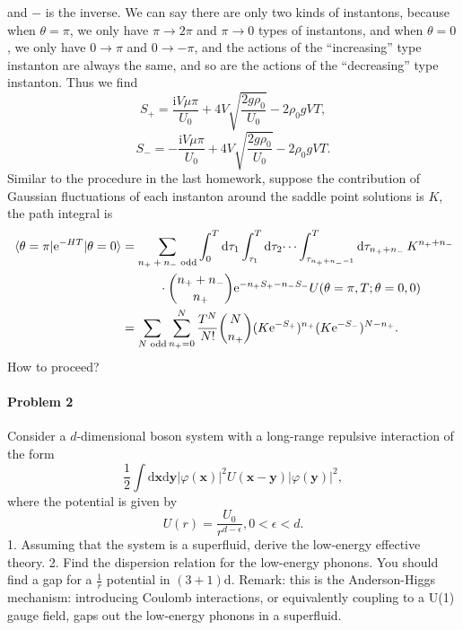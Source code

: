 \documentclass[hyperref, a4paper]{article}
\newcommand*{\ii}{\mathrm{i}}
\newcommand*{\ee}{\mathrm{e}}
\begin{document}
\begin{itemize}
and $-$ is the inverse.
We can say there are only two kinds of instantons,
because when $\theta = \pi$,
we only have $\pi \to 2\pi$ and $\pi \to 0$ types of instantons,
and when $\theta = 0$,
we only have $0 \to \pi$ and $0 \to - \pi$,
and the actions of the ``increasing'' type instanton are always the same,
and so are the actions of the ``decreasing'' type instanton.
Thus we find 
\begin{equation}
    S_+ = \frac{\ii V \mu \pi}{U_0} + 4 V \sqrt{\frac{2 g \rho_0}{U_0}} - 2 \rho_0 g V T,
\end{equation}
\begin{equation}
    S_- = - \frac{\ii V \mu \pi}{U_0} + 4 V \sqrt{\frac{2 g \rho_0}{U_0}} - 2 \rho_0 g V T.
\end{equation}
Similar to the procedure in the last homework,
suppose the contribution of Gaussian fluctuations of each instanton around the saddle point solutions is $K$,
the path integral is 
\begin{equation}
    \begin{aligned}
        \mel{\theta = \pi}{\ee^{- H T}}{\theta = 0} &= \sum_{\text{$n_+ + n_-$ odd}}
        \int_0^{T} \dd{\tau_1} \int_{\tau_1}^{T} \dd{\tau_2} \dots \int_{\tau_{n_+ + n_- - 1}}^T 
        \dd{\tau_{n_+ + n_-}} K^{n_+ + n_-}  \\
        &\quad \quad \quad \cdot \binom{n_+ + n_-}{n_+} \ee^{- n_+ S_+ - n_- S_-} U(\theta = \pi, T; \theta = 0, 0) \\
        &= \sum_{\text{$N$ odd}} \sum_{n_+ = 0}^N \frac{T^N}{N!} 
        \binom{N}{n_+} (K \ee^{- S_+})^{n_+} (K \ee^{- S_-})^{N - n_+}.
    \end{aligned}
\end{equation}
How to proceed?

\end{itemize}

\paragraph{Problem 2} Consider a $d$-dimensional boson system with a long-range repulsive interaction of the form
$$
\frac{1}{2} \int \mathrm{d} \mathbf{x} \mathrm{d} \mathbf{y}|\varphi(\mathbf{x})|^2 U(\mathbf{x}-\mathbf{y})|\varphi(\mathbf{y})|^2,
$$
where the potential is given by
$$
U(r)=\frac{U_0}{r^{d-\epsilon}}, 0<\epsilon<d .
$$
1. Assuming that the system is a superfluid, derive the low-energy effective theory.
2. Find the dispersion relation for the low-energy phonons. You should find a gap for a $\frac{1}{r}$ potential in $(3+1) \mathrm{d}$.
Remark: this is the Anderson-Higgs mechanism: introducing Coulomb interactions, or equivalently coupling to a U(1) gauge field, gaps out the low-energy phonons in a superfluid.
\end{document}
